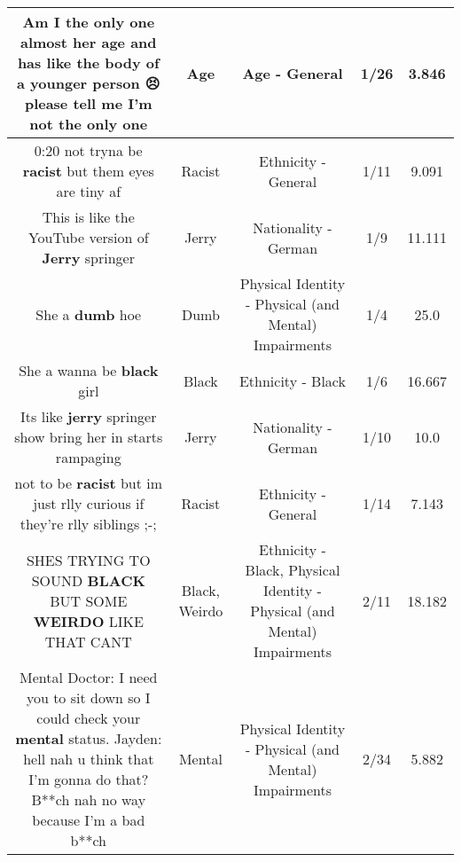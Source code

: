 \documentclass[11pt]{article}
\newlength\mylength
\begin{document}
\begin{center}
\begin{longtable}{|C{.65\mylength}|C{.30\mylength}|C{.12\mylength}|C{.12\mylength}|C{.12\mylength}|}
  \small Am I the only one almost her \textbf{age} and has like the body of a younger person 😣 please tell me I'm not the only one\normalsize   & Age & Age - General & 1/26 & 3.846 \\  \hline
  \small 0:20 not tryna be \textbf{racist} but them eyes are tiny af\normalsize   & Racist & Ethnicity - General & 1/11 & 9.091 \\  \hline
  \small This is like the YouTube version of \textbf{Jerry} springer\normalsize   & Jerry & Nationality - German & 1/9 & 11.111 \\  \hline
  \small She a \textbf{dumb} hoe\normalsize   & Dumb & Physical Identity - Physical (and Mental) Impairments & 1/4 & 25.0 \\  \hline
  \small She a wanna be \textbf{black} girl\normalsize   & Black & Ethnicity - Black & 1/6 & 16.667 \\  \hline
  \small Its like \textbf{jerry} springer show bring her in starts rampaging\normalsize   & Jerry & Nationality - German & 1/10 & 10.0 \\  \hline
  \small not to be \textbf{racist} but im just rlly curious if they're rlly siblings ;-;\normalsize   & Racist & Ethnicity - General & 1/14 & 7.143 \\  \hline
  \small SHES TRYING TO SOUND \textbf{BLACK} BUT SOME \textbf{WEIRDO} LIKE THAT CANT\normalsize   & Black, Weirdo & Ethnicity - Black, Physical Identity - Physical (and Mental) Impairments & 2/11 & 18.182 \\  \hline
  \small Mental Doctor: I need you to sit down so I could check your \textbf{mental} status.   Jayden: hell nah u think that I'm gonna do that? B**ch nah no way because I'm a bad b**ch\normalsize   & Mental & Physical Identity - Physical (and Mental) Impairments & 2/34 & 5.882 \\  \hline

\end{longtable}
\end{center}
\end{document}
